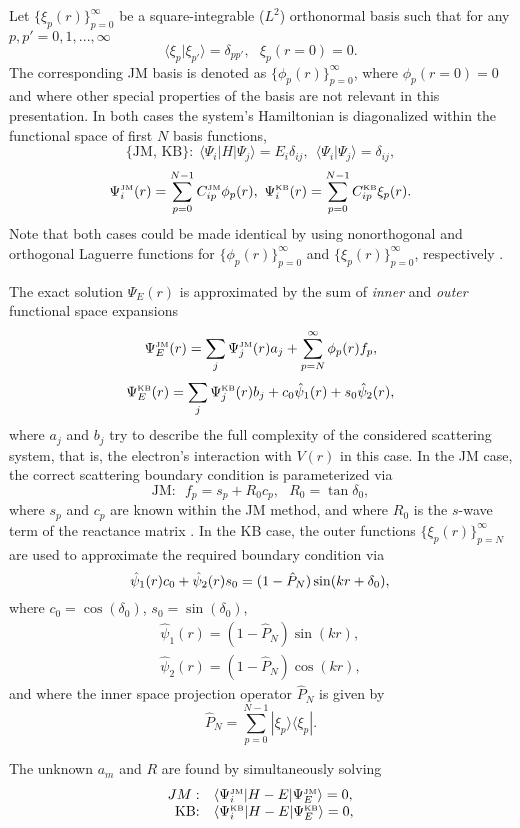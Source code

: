 \documentclass[aip
, pra
, showpacs
, aps
, twocolumn
, groupedaddress
, floatfix
]{revtex4}
\newcommand{\beq}{\begin{equation}}
\newcommand{\eeq}{\end{equation}}
\newcommand{\barr}{\begin{array}}
\newcommand{\earr}{\end{array}}
\newcommand{\JM}{\mbox{\tiny{JM}}}
\newcommand{\KB}{\mbox{\tiny{KB}}}
\begin{document}
Let $\{\xi_p(r)\}_{p=0}^\infty$ be a square-integrable ($L^2$) orthonormal basis
such that
for any $p,p'=0,1,...,\infty$
\beq
\langle \xi_p | \xi_{p'} \rangle=\delta_{pp'}, \ \ \ \xi_p(r=0)=0.
\eeq
The corresponding JM basis is denoted as $\{\phi_p(r)\}_{p=0}^\infty$, where $\phi_p(r=0)=0$ 
and where other special properties of the basis are not relevant in this presentation.
In both cases the system's Hamiltonian is diagonalized within the functional space of first $N$ basis functions,  
\beq 
\mbox{\{JM, KB\}:} \ \ \langle \Psi_i |H| \Psi_j \rangle = E_i \delta_{ij} , \ \ \langle \Psi_i | \Psi_j \rangle=\delta_{ij},
\eeq
\beq
\Psi_i^{\JM}(r) = \sum_{p=0}^{N-1} C_{ip}^{\JM} \phi_p(r), \  
\Psi_i^{\KB}(r) = \sum_{p=0}^{N-1} C_{ip}^{\KB} \xi_p(r).
\eeq
Note that both cases could be made identical by using nonorthogonal and orthogonal Laguerre functions for 
$\{\phi_p(r)\}_{p=0}^\infty$ and $\{\xi_p(r)\}_{p=0}^\infty$, respectively \cite{KB10p022708}.

The exact solution $\Psi_E(r)$ is approximated by the sum of {\em inner} and {\em outer} functional space expansions
\beq
\Psi_E^{\JM}(r) =\sum_j \Psi_j^{\JM}(r)a_j  + \sum_{p=N}^{\infty} \phi_p(r) f_p,
\eeq
\beq
\Psi_E^{\KB}(r) =\sum_j \Psi_j^{\KB}(r) b_j  + c_0 \hat{\psi}_1(r)  + s_0 \hat{\psi}_2(r) ,
\eeq
where $a_j$ and $b_j$ try to describe the full complexity of the considered scattering system, that is, 
the electron's interaction with  $V(r)$ in this case. 
In the JM case, the correct scattering boundary condition is parameterized via     
\beq
\mbox{JM:} \ \ \ f_p = s_p + R_0 c_p, \ \ \ R_0 = \tan \delta_0,
\eeq
where $s_p$ and $c_p$  are known within the JM method, and where $R_0$ is the $s$-wave term of the reactance matrix \cite{Taylor72}.
In the KB case, the outer functions $\{\xi_p(r)\}_{p=N}^\infty$ are used to approximate the required boundary condition via 
\beq
\hat{\psi}_1(r) c_0 + \hat{\psi}_2(r) s_0 =
(1-\hat{P}_N) \sin(kr + \delta_0),\\
\eeq
where $c_0 = \cos(\delta_0)$, $s_0 = \sin(\delta_0)$, 
\beq \barr{l}
\hat{\psi}_1(r) = (1-\hat{P}_N) \sin(kr),\\
\hat{\psi}_2(r) = (1-\hat{P}_N) \cos(kr),
\earr \eeq
and where the inner space projection operator $\hat{P}_N$ is given by \\
\beq
\hat{P}_N = \sum_{p=0}^{N-1} | \xi_p \rangle \langle \xi_p |.
\eeq



The unknown $a_m$ and $R$ are found by simultaneously solving
\beq \barr{rl}
JM: & \langle\Psi_i^{\JM}|H-E|\Psi_E^{\JM}\rangle= 0, \\
\mbox{KB:} & \langle\Psi_i^{\KB}|H-E|\Psi_E^{\KB}\rangle=0 ,
\earr \eeq
\end{document}
